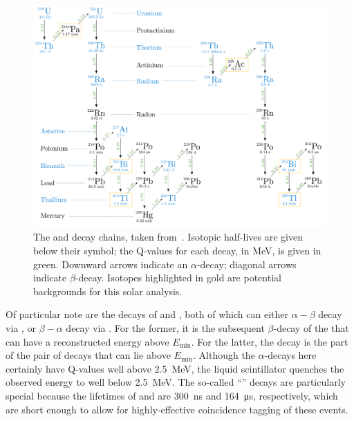 \begin{figure}[!th]
    \centering
    \includegraphics[width=\textwidth]{6_SolarAnalysis/images/U238_Th232_decay_chains_tereza.png}
    \caption[The  and  decay chains.]{The  and  decay chains, taken from~\cite{kroupovaImprovingSensitivityNeutrinoless2020}. %
    Isotopic half-lives are given below their symbol; the Q-values for each decay, in MeV, is given in green. Downward arrows indicate an $\alpha$-decay; diagonal arrows indicate $\beta$-decay. Isotopes highlighted in gold are potential backgrounds for this solar analysis.}
    \label{fig:u_th_decay_chains}
\end{figure}

Of particular note are the decays of  and , both of which can either $\alpha-\beta$ decay via , or $\beta-\alpha$ decay via . For the former, it is the subsequent $\beta$-decay of the  that can have a reconstructed energy above $E_{\textrm{min}}$. For the latter, the  decay is the part of the pair of decays that can lie above $E_{\textrm{min}}$. Although the $\alpha$-decays here certainly have Q-values well above \SI{2.5}{\MeV}, the liquid scintillator quenches the observed energy to well below \SI{2.5}{\MeV}. The so-called ``'' decays are particularly special because the lifetimes of  and  are \SI{300}{\nano\second} and \SI{164}{\micro\second}, respectively, which are short enough to allow for highly-effective coincidence tagging of these events.

